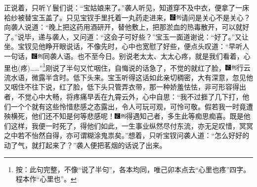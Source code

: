 正说着，只听丫鬟们说：“宝姑娘来了。”袭人听见，知道穿不及中衣，便拿了一床袷纱被替宝玉盖了。只见宝钗手里托着一丸药走进来，{\includegraphics[width=3mm]{../Images/00006}\includegraphics[width=3mm]{../Images/00011}\footnotesize \kaishu 请问是关心不是关心？}向袭人说道：“晚上把这药用酒研开，替他敷上，把那淤血的热毒散开，可以就好了。”说毕，递与袭人，又问道：“这会子可好些？”宝玉一面道谢说：“好了。”又让坐。宝钗见他睁开眼说话，不像先时，心中也宽慰了好些，便点头叹道：“早听人一句话，{\includegraphics[width=3mm]{../Images/00006}\includegraphics[width=3mm]{../Images/00011}\footnotesize \kaishu 同袭人语。}也不至今日。别说老太太、太太心疼，就是我们看着，心里也{(疼)}\ldots{}\ldots{}”\footnote{按：此句完整，不像“说了半句”，各本均同，唯己卯本点去“心里也疼”四字。程本作“心里也”。}刚说了半句又忙咽住，自悔说的话急了，不觉的就红了脸，{\includegraphics[width=3mm]{../Images/00006}\includegraphics[width=3mm]{../Images/00011}\footnotesize \kaishu 行云流水语，微露半含时。}低下头来。宝玉听得这话如此亲切稠密，大有深意，忽见他又咽住不往下说，红了脸，低下头只管弄衣带，那一种娇羞怯怯，非可形容得出者，不觉心中大畅，将疼痛早丢在九霄云外，心中自思：“我不过捱了几下打，他们一个个就有这些怜惜悲感之态露出，令人可玩可观，可怜可敬。假若我一时竟遭殃横死，他们还不知是何等悲感呢！{\includegraphics[width=3mm]{../Images/00006}\includegraphics[width=3mm]{../Images/00011}\footnotesize \kaishu 得遇知己者，多生此等痴思痴喜。}既是他们这样，我便一时死了，得他们如此，一生事业纵然尽付东流，亦无足叹惜，冥冥之中若不怡然自得，亦可谓糊涂鬼祟矣。”想着，只听宝钗问袭人道：“怎么好好的动了气，就打起来了？”袭人便把茗烟的话说了出来。

